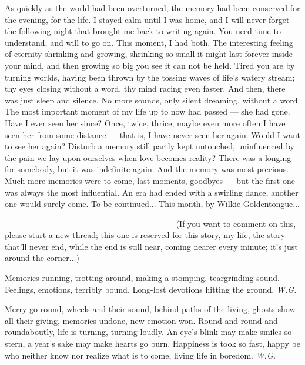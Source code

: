 As quickly as the world had been overturned, the memory had been conserved for the evening, for the life. I stayed calm until I was home, and I will never forget the following night that brought me back to writing again. You need time to understand, and will to go on. This moment, I had both. 
The interesting feeling of eternity shrinking and growing, shrinking so small it might last forever inside your mind, and then growing so big you see it can not be held. 
Tired you are by turning worlds, having been thrown by the tossing waves of life's watery stream; thy eyes closing without a word, thy mind racing even faster. 
And then, there was just sleep and silence. No more sounds, only silent dreaming, without a word. The most important moment of my life up to now had passed --- she had gone. Have I ever seen her since? 
Once, twice, thrice, maybe even more often I have seen her from some distance --- that is, I have never seen her again. 
Would I want to see her again? Disturb a memory still partly kept untouched, uninfluenced by the pain we lay upon ourselves when love becomes reality? There was a longing for somebody, but it was indefinite again. And the memory was most precious. 
Much more memories were to come, last moments, goodbyes --- but the first one was always the most influential. 
An era had ended with a swirling dance, another one would surely come. 
To be continued...
This month, by Wilkie Goldentongue...

--------------------------------------------------------------
(If you want to comment on this, please start a new thread; this one is reserved for this story, my life, the story that'll never end, while the end is still near, coming nearer every minute; it's just around the corner...)

Memories running, 
trotting around, 
making a stomping, 
teargrinding sound. 
Feelings, emotions, 
terribly bound, 
Long-lost devotions 
hitting the ground. 
\emph{W.G.}

Merry-go-round, 
wheels and their sound, 
behind paths of the living, 
ghosts show all their giving, 
memories undone, 
new emotion won. 
Round and round and roundaboutly, 
life is turning, turning loudly. 
An eye's blink may make smiles so stern, 
a year's sake may make hearts go burn. 
Happiness is took so fast, 
happy be who neither know
nor realize what is to come, 
living life in boredom. 
\emph{W.G.}
